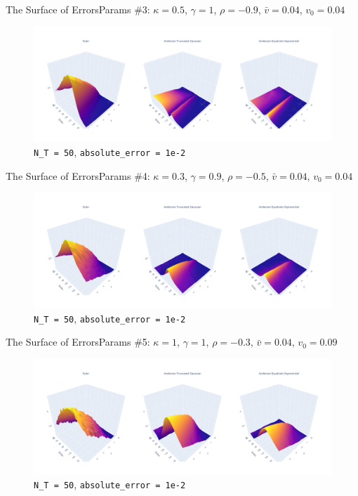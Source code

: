 \begin{frame}{The Surface of Errors}{Params \#3: $\kappa = 0.5$, $\gamma = 1$, $\rho = -0.9$, $\bar v = 0.04$, $v_0 = 0.04$}
    \begin{figure}
        \includegraphics[width=\textwidth]{part4/pictures/err_surface_strike_T_N_T=50_param3.pdf}
        \caption{\texttt{N\_T = 50}, \texttt{absolute\_error = 1e-2}}
    \end{figure}
\end{frame}

\begin{frame}{The Surface of Errors}{Params \#4: $\kappa = 0.3$, $\gamma = 0.9$, $\rho = -0.5$, $\bar v = 0.04$, $v_0 = 0.04$}
    \begin{figure}
        \includegraphics[width=\textwidth]{part4/pictures/err_surface_strike_T_N_T=50_param4.pdf}
        \caption{\texttt{N\_T = 50}, \texttt{absolute\_error = 1e-2}}
    \end{figure}
\end{frame}

\begin{frame}{The Surface of Errors}{Params \#5: $\kappa = 1$, $\gamma = 1$, $\rho = -0.3$, $\bar v = 0.04$, $v_0 = 0.09$}
    \begin{figure}
        \includegraphics[width=\textwidth]{part4/pictures/err_surface_strike_T_N_T=50_param5.pdf}
        \caption{\texttt{N\_T = 50}, \texttt{absolute\_error = 1e-2}}
    \end{figure}
\end{frame}

